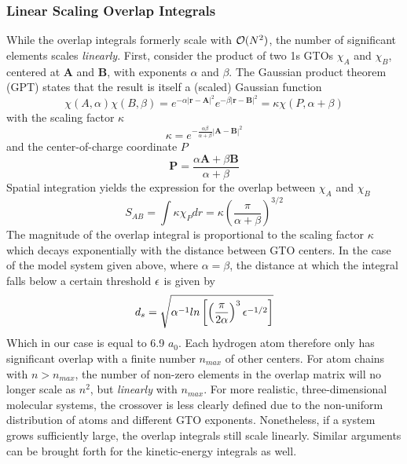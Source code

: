 \subsubsection{Linear Scaling Overlap Integrals}

While the overlap integrals formerly scale with $\mathcal{O}(N^{2})$, the number of significant elements scales \emph{linearly}. First, consider the product of two 1s GTOs $\chi_{A}$ and $\chi_{B}$, centered at $\mathbf{A}$ and $\mathbf{B}$, with exponents $\alpha$ and $\beta$. The Gaussian product theorem (GPT) states that the result is itself a (scaled) Gaussian function
\begin{equation}
\chi(A,\alpha) \chi(B,\beta) = e^{-\alpha \left\lvert \mathbf{r} - \mathbf{A} \right\rvert^2} e^{-\beta \left\lvert \mathbf{r} - \mathbf{B} \right\rvert^2} = \kappa \chi(P,\alpha+\beta)  
\end{equation}
\noindent with the scaling factor $\kappa$ 
\begin{equation}
\kappa = e^{-\frac{\alpha\beta}{\alpha+\beta}\left\lvert \mathbf{A} - \mathbf{B} \right\rvert^2}
\end{equation}
\noindent and the center-of-charge coordinate $P$
\begin{equation}
\mathbf{P} = \frac{\alpha \mathbf{A} + \beta \mathbf{B}}{\alpha + \beta}
\end{equation}
\noindent Spatial integration yields the expression for the overlap between $\chi_A$ and $\chi_B$
\begin{equation}
S_{AB} = \int \kappa \chi_{P} dr = \kappa \left(\frac{\pi}{\alpha + \beta}\right)^{3/2}
\end{equation} 
\noindent The magnitude of the overlap integral is proportional to the scaling factor $\kappa$ which decays exponentially with the distance between GTO centers. In the case of the model system given above, where $\alpha = \beta$, the distance at which the integral falls below a certain threshold $\epsilon$ is given by 
\begin{equation}
d_s = \sqrt{\alpha^{-1} ln \left[ \left( \frac{\pi}{2\alpha}\right)^3 \epsilon^{-1/2} \right]}
\end{equation} 
\noindent Which in our case is equal to 6.9 $a_0$. Each hydrogen atom therefore only has significant overlap with a finite number $n_{max}$ of other centers. For atom chains with $n > n_{max}$, the number of non-zero elements in the overlap matrix will no longer scale as $n^2$, but \emph{linearly} with $n_{max}$. For more realistic, three-dimensional molecular systems, the crossover is less clearly defined due to the non-uniform distribution of atoms and different GTO exponents. Nonetheless, if a system grows sufficiently large, the overlap integrals still scale linearly. Similar arguments can be brought forth for the kinetic-energy integrals as well. 

